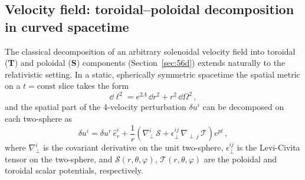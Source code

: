 \subsection{Velocity field: toroidal--poloidal decomposition in
  curved spacetime}
\label{subsec:rel-56-TP}

The classical decomposition of an arbitrary solenoidal velocity field into
toroidal (\textbf{T}) and poloidal (\textbf{S}) components
(Section~\ref{sec:56d}) extends naturally to the relativistic setting.
In a static, spherically symmetric spacetime
the spatial metric on a $t = \text{const}$ slice takes the form
\begin{equation}
  \dd\ell^{2}
  = e^{2\Lambda}\,\dd r^{2}
    + r^{2}\,\dd\Omega^{2} \,,
  \label{eq:rel6-spatial}
\end{equation}
and the spatial part of the 4-velocity perturbation $\delta u^{i}$ can
be decomposed on each two-sphere as
\begin{equation}
  \delta u^{i}
  = \delta u^{r}\,\hat{e}_{r}^{i}
    + \frac{1}{r}\left(
        \nabla_{\!\perp}^{i}\,\mathscr{S}
        + \epsilon^{ij}_{\perp}\,\nabla_{\!\perp\,j}\,\mathscr{T}
      \right) e^{pt} \,,
  \label{eq:rel6-TP-decomp}
\end{equation}
where $\nabla_{\!\perp}^{i}$ is the covariant derivative on the
unit two-sphere, $\epsilon^{ij}_{\perp}$ is the Levi-Civita tensor on
the two-sphere, and $\mathscr{S}(r,\theta,\varphi)$,
$\mathscr{T}(r,\theta,\varphi)$ are the poloidal and toroidal scalar
potentials, respectively.

